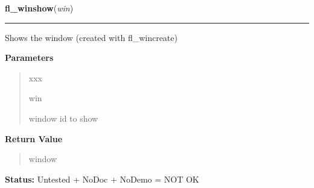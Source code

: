 \hspace{.8\funcindent}\begin{boxedminipage}{\funcwidth}

    \raggedright \textbf{fl\_winshow}(\textit{win})

    \vspace{-1.5ex}

    \rule{\textwidth}{0.5\fboxrule}
\setlength{\parskip}{2ex}
    Shows the window (created with fl\_wincreate)

\setlength{\parskip}{1ex}
      \textbf{Parameters}
      \vspace{-1ex}

      \begin{quote}
        \begin{Ventry}{xxx}

          \item[win]

          window id to show

        \end{Ventry}

      \end{quote}

      \textbf{Return Value}
    \vspace{-1ex}

      \begin{quote}
      window

      \end{quote}

\textbf{Status:} Untested + NoDoc + NoDemo = NOT OK



    \end{boxedminipage}

    \label{xformslib:library:fl_winopen}

    \vspace{0.5ex}

